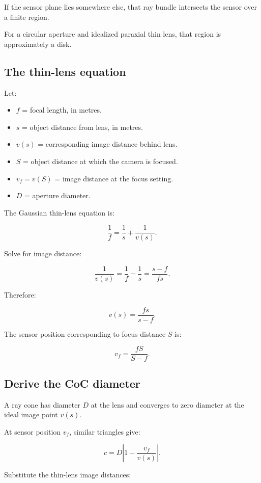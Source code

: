 If the sensor plane lies somewhere else, that ray bundle intersects the sensor over a finite region.

For a circular aperture and idealized paraxial thin lens, that region is approximately a disk.

\subsection{The thin-lens equation}\label{02-foundations-ii-ch036-the-thin-lens-equation}

Let:

\begin{itemize}
\tightlist
\item
  \(f\) = focal length, in metres.
\item
  \(s\) = object distance from lens, in metres.
\item
  \(v(s)\) = corresponding image distance behind lens.
\item
  \(S\) = object distance at which the camera is focused.
\item
  \(v_f=v(S)\) = image distance at the focus setting.
\item
  \(D\) = aperture diameter.
\end{itemize}

The Gaussian thin-lens equation is:

\[ \boxed{ \frac1f=\frac1s+\frac1{v(s)}. } \]

Solve for image distance:

\[ \frac1{v(s)}=\frac1f-\frac1s =\frac{s-f}{fs}. \]

Therefore:

\[ \boxed{ v(s)=\frac{fs}{s-f}. } \]

The sensor position corresponding to focus distance \(S\) is:

\[ \boxed{ v_f=\frac{fS}{S-f}. } \]

\subsection{Derive the CoC diameter}\label{02-foundations-ii-ch036-derive-the-coc-diameter}

A ray cone has diameter \(D\) at the lens and converges to zero diameter at the ideal image point \(v(s)\).

At sensor position \(v_f\), similar triangles give:

\[ \boxed{ c=D\left|1-\frac{v_f}{v(s)}\right|. } \]

Substitute the thin-lens image distances:

